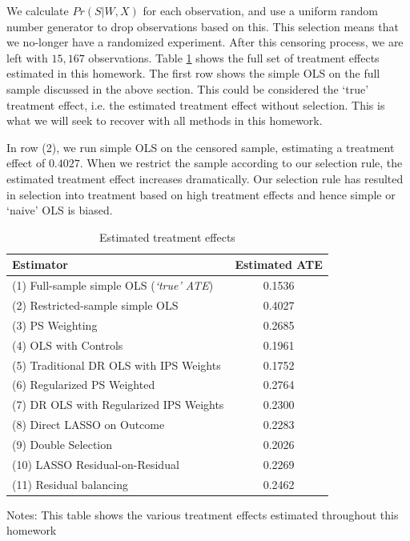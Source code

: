 \documentclass[paper=letter, fontsize=11pt]{scrartcl} %
\begin{document}
We calculate $Pr(S|W,X)$ for each observation, and use a uniform random number generator to drop observations based on this. This selection means that we no-longer have a randomized experiment. After this censoring process, we are left with $15,167$ observations. Table \ref{treat} shows the full set of treatment effects estimated in this homework. The first row shows the simple OLS on the full sample discussed in the above section. This could be considered the `true' treatment effect, i.e. the estimated treatment effect without selection. This is what we will seek to recover with all methods in this homework. 

In row (2), we run simple OLS on the censored sample, estimating a treatment effect of $0.4027$. When we restrict the sample according to our selection rule, the estimated treatment effect increases dramatically. Our selection rule has resulted in selection into treatment based on high treatment effects and hence simple or `naive' OLS is biased.

\begin{table}[htbp]  \small
 \centering
  \begin{threeparttable}  
\caption{Estimated treatment effects \label{treat}}\begin{tabular}{l*{1}{c}}
\hline
Estimator           &     Estimated ATE     
\rule{0pt}{4ex}  \\
\hline\hline 
(1) Full-sample simple OLS (\textit{`true' ATE}) &  0.1536 \rule{0pt}{4ex} \\

(2) Restricted-sample simple OLS &  0.4027  \\ \hline
(3) PS Weighting          &            0.2685 \rule{0pt}{4ex} \\
(4) OLS with Controls       &            0.1961 \\ 
(5) Traditional DR OLS with IPS Weights & 0.1752\\ \hline 
(6) Regularized PS Weighted &             0.2764  \rule{0pt}{4ex} \\
(7) DR OLS with Regularized IPS Weights & 0.2300 \\ 
(8) Direct LASSO on Outcome &   0.2283 \\   \hline
(9) Double Selection       &    0.2026 \rule{0pt}{4ex} \\
(10) LASSO Residual-on-Residual & 0.2269 \\
(11) Residual balancing & 0.2462 \\
\end{tabular}
\begin{tablenotes}
\item Notes: This table shows the various treatment effects estimated throughout this homework
    \end{tablenotes}
  \end{threeparttable}
\end{table}
\end{document}
